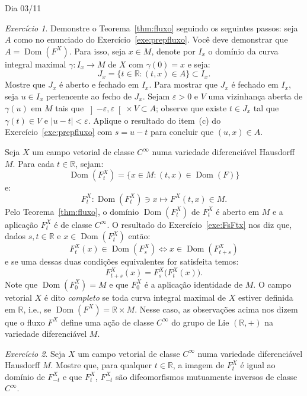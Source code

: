 \documentclass[oneside,11pt]{amsart}
\newcommand{\R}{\mathds R}
\DeclareMathOperator{\Dom}{Dom}
\theoremstyle{remark}\newtheorem{exercise}{Exercício}[section]
\theoremstyle{plain}\newtheorem{teo}{Teorema}[section]
\theoremstyle{plain}\newtheorem{lem}[teo]{Lema}
\theoremstyle{plain}\newtheorem{prop}[teo]{Proposição}
\theoremstyle{definition}\newtheorem{defin}[teo]{Definição}
\theoremstyle{remark}\newtheorem{rem}[teo]{Observação}
\theoremstyle{definition}\newtheorem{example}[teo]{Exemplo}
\numberwithin{equation}{section}
\begin{document}
\begin{section}{Dia 03/11}
\begin{exercise}
Demonstre o Teorema~\ref{thm:fluxo} seguindo os seguintes passos: seja $A$ como no enunciado do Exercício~\ref{exe:prepfluxo}. Você deve demonstrar que
$A=\Dom(F^X)$. Para isso, seja $x\in M$, denote por $I_x$ o domínio da curva integral maximal $\gamma:I_x\to M$ de $X$ com $\gamma(0)=x$ e seja:
\[J_x=\big\{t\in\R:(t,x)\in A\big\}\subset I_x.\]
Mostre que $J_x$ é aberto e fechado em $I_x$. Para mostrar que $J_x$ é fechado em $I_x$, seja $u\in I_x$ pertencente ao fecho de $J_x$. Sejam
$\varepsilon>0$ e $V$ uma vizinhança aberta de $\gamma(u)$ em $M$ tais que $\left]-\varepsilon,\varepsilon\right[\times V\subset A$; observe que
existe $t\in J_x$ tal que $\gamma(t)\in V$ e $\vert u-t\vert<\varepsilon$. Aplique o resultado do item~(c) do Exercício~\ref{exe:prepfluxo} com $s=u-t$
para concluir que $(u,x)\in A$.
\end{exercise}

Seja $X$ um campo vetorial de classe $C^\infty$ numa variedade diferenciável Hausdorff $M$. Para cada $t\in\R$, sejam:
\[\Dom(F^X_t)=\big\{x\in M:(t,x)\in\Dom(F)\big\}\]
e:
\[F^X_t:\Dom(F^X_t)\ni x\longmapsto F^X(t,x)\in M.\]
Pelo Teorema~\ref{thm:fluxo}, o domínio $\Dom(F^X_t)$ de $F^X_t$ é aberto em $M$ e a aplicação $F^X_t$ é de classe $C^\infty$.
O resultado do Exercício~\ref{exe:FsFtx} nos diz que, dados $s,t\in\R$ e $x\in\Dom(F^X_t)$ então:
\[F^X_t(x)\in\Dom(F^X_s)\Longleftrightarrow x\in\Dom(F^X_{t+s})\]
e se uma dessas duas condições equivalentes for satisfeita temos:
\begin{equation}\label{eq:FXtpluss}
F^X_{t+s}(x)=F^X_s\big(F^X_t(x)\big).
\end{equation}
Note que $\Dom(F^X_0)=M$ e que $F^X_0$ é a aplicação identidade de $M$. O campo vetorial $X$ é dito {\em completo\/} se toda curva integral maximal
de $X$ estiver definida em $\R$, i.e., se $\Dom(F^X)=\R\times M$. Nesse caso, as observações acima nos dizem
que o fluxo $F^X$ define uma ação de classe $C^\infty$ do grupo de Lie $(\R,+)$ na variedade diferenciável $M$.

\begin{exercise}\label{exe:Ftdifeo}
Seja $X$ um campo vetorial de classe $C^\infty$ numa variedade diferenciável Hausdorff $M$. Mostre que, para qualquer $t\in\R$, a imagem de $F^X_t$ é
igual ao domínio de $F^X_{-t}$ e que $F^X_t$, $F^X_{-t}$ são difeomorfismos mutuamente inversos de classe $C^\infty$.
\end{exercise}


\end{section}
\end{document}
